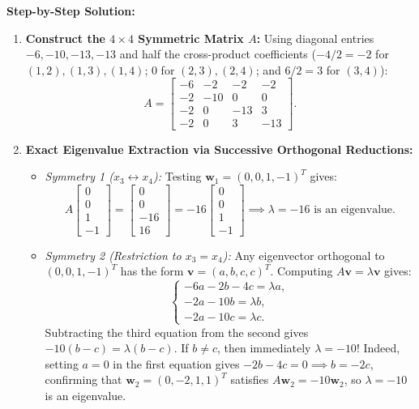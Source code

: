 \documentclass[11pt, letterpaper]{article}
\theoremstyle{definition}
\theoremstyle{remark}
\begin{document}
\textbf{Step-by-Step Solution:}
\begin{enumerate}[leftmargin=2em]
    \item \textbf{Construct the $4 \times 4$ Symmetric Matrix $A$:}
    Using diagonal entries $-6, -10, -13, -13$ and half the cross-product coefficients ($-4/2 = -2$ for $(1,2), (1,3), (1,4)$; $0$ for $(2,3), (2,4)$; and $6/2 = 3$ for $(3,4)$):
    \[
    A = \begin{bmatrix}
    -6 & -2 & -2 & -2 \\
    -2 & -10 & 0 & 0 \\
    -2 & 0 & -13 & 3 \\
    -2 & 0 & 3 & -13
    \end{bmatrix}.
    \]
    \item \textbf{Exact Eigenvalue Extraction via Successive Orthogonal Reductions:}
    \begin{itemize}
        \item \emph{Symmetry 1 ($x_3 \leftrightarrow x_4$):} Testing $\mathbf{w}_1 = (0, 0, 1, -1)^T$ gives:
        \[
        A \begin{bmatrix} 0 \\ 0 \\ 1 \\ -1 \end{bmatrix} = \begin{bmatrix} 0 \\ 0 \\ -16 \\ 16 \end{bmatrix} = -16 \begin{bmatrix} 0 \\ 0 \\ 1 \\ -1 \end{bmatrix} \implies \lambda = -16 \text{ is an eigenvalue.}
        \]
        \item \emph{Symmetry 2 (Restriction to $x_3 = x_4$):} Any eigenvector orthogonal to $(0, 0, 1, -1)^T$ has the form $\mathbf{v} = (a, b, c, c)^T$. Computing $A\mathbf{v} = \lambda \mathbf{v}$ gives:
        \[
        \begin{cases}
        -6a - 2b - 4c = \lambda a, \\
        -2a - 10b = \lambda b, \\
        -2a - 10c = \lambda c.
        \end{cases}
        \]
        Subtracting the third equation from the second gives $-10(b - c) = \lambda(b - c)$. If $b \neq c$, then immediately $\lambda = -10$! Indeed, setting $a = 0$ in the first equation gives $-2b - 4c = 0 \implies b = -2c$, confirming that $\mathbf{w}_2 = (0, -2, 1, 1)^T$ satisfies $A\mathbf{w}_2 = -10\mathbf{w}_2$, so $\lambda = -10$ is an eigenvalue.

\end{itemize}
\end{enumerate}
\end{document}
